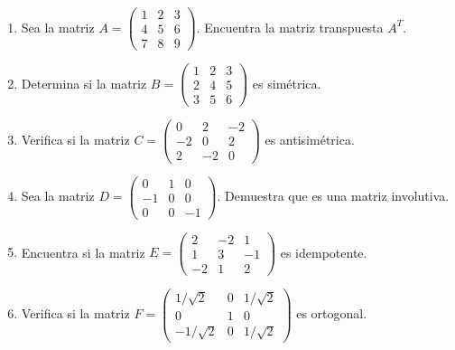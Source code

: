 \documentclass[10pt,a4paper]{article}
\begin{document}
\begin{enumerate}[resume]
    \item Sea la matriz $A = \begin{pmatrix} 1 & 2 & 3 \\ 4 & 5 & 6 \\ 7 & 8 & 9 \end{pmatrix}$. Encuentra la matriz transpuesta $A^T$.
    \item Determina si la matriz $B = \begin{pmatrix} 1 & 2 & 3 \\ 2 & 4 & 5 \\ 3 & 5 & 6 \end{pmatrix}$ es simétrica.
    \item Verifica si la matriz $C = \begin{pmatrix} 0 & 2 & -2 \\ -2 & 0 & 2 \\ 2 & -2 & 0 \end{pmatrix}$ es antisimétrica.
    \item Sea la matriz $D = \begin{pmatrix} 0 & 1 & 0 \\ -1 & 0 & 0 \\ 0 & 0 & -1 \end{pmatrix}$. Demuestra que es una matriz involutiva.

    \item Encuentra si la matriz $E = \begin{pmatrix} 2 & -2 & 1 \\ 1 & 3 & -1 \\ -2 & 1 & 2 \end{pmatrix}$ es idempotente.

    \item Verifica si la matriz $F = \begin{pmatrix} 1/\sqrt{2} & 0 & 1/\sqrt{2} \\ 0 & 1 & 0 \\ -1/\sqrt{2} & 0 & 1/\sqrt{2} \end{pmatrix}$ es ortogonal.


\end{enumerate}
\end{document}
